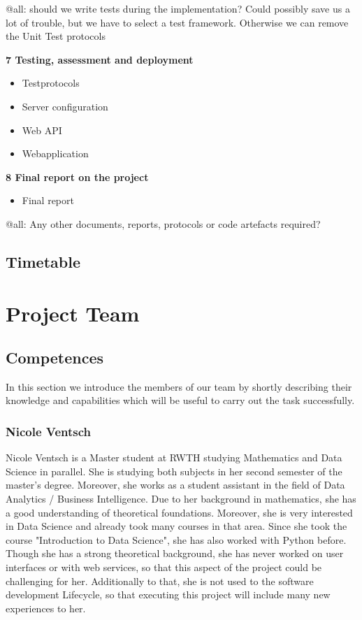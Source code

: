 \documentclass[notitlepage]{article}
\begin{document}
\begin{flushleft}
{\color{red} @all: should we write tests during the implementation? Could possibly save us a lot of trouble, but we have to select a test framework.
Otherwise we can remove the Unit Test protocols}

\textbf{7 Testing, assessment and deployment}
\\
\begin{itemize}
	\item Testprotocols
	\item Server configuration
	\item Web API 
	\item Webapplication
\end{itemize}

\textbf{8 Final report on the project}
\\
\begin{itemize}
	\item Final report
\end{itemize}

{\color{red} @all: Any other documents, reports, protocols or code artefacts required?}

\subsection{Timetable}

\section{Project Team}

\subsection{Competences} 
In this section we introduce the members of our team by shortly describing their knowledge and capabilities which will be useful to carry out the task successfully.

\subsubsection*{Nicole Ventsch}

Nicole Ventsch is a Master student at RWTH studying Mathematics and Data Science in parallel. She is studying both subjects in her second semester of the master's degree. Moreover, she works as a student assistant in the field of Data Analytics / Business Intelligence. Due to her background in mathematics, she has a good understanding of theoretical foundations. Moreover, she is very interested in Data Science and already took many courses in that area. Since she took the course "Introduction to Data Science", she has also worked with Python before. Though she has a strong theoretical background, she has never worked on user interfaces or with web services, so that this aspect of the project could be challenging for her. Additionally to that, she is not used to the software development Lifecycle, so that executing this project will include many new experiences to her. 


\end{flushleft}
\end{document}

